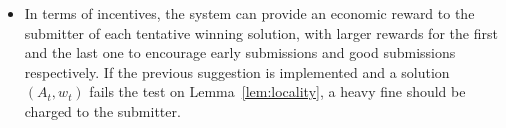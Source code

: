\begin{itemize}
\item In terms of incentives, the system can provide an economic reward to the submitter of each tentative winning solution, with larger rewards for the first and the last one to encourage early submissions and good submissions respectively. If the previous suggestion is implemented and a solution $(A_t, w_t)$ fails the test on Lemma~\ref{lem:locality}, a heavy fine should be charged to the submitter. 
\end{itemize}